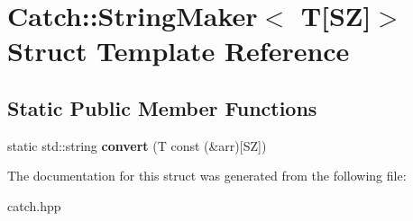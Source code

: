 \hypertarget{structCatch_1_1StringMaker_3_01T[SZ]_4}{}\section{Catch\+:\+:String\+Maker$<$ T\mbox{[}SZ\mbox{]}$>$ Struct Template Reference}
\label{structCatch_1_1StringMaker_3_01T[SZ]_4}
\subsection*{Static Public Member Functions}
\begin{DoxyCompactItemize}
\item 
static std\+::string {\bfseries convert} (T const (\&arr)\mbox{[}SZ\mbox{]})\hypertarget{structCatch_1_1StringMaker_3_01T[SZ]_4_ab10ef3c2111d6faa2ed2f23a1e00c29a}{}\label{structCatch_1_1StringMaker_3_01T[SZ]_4_ab10ef3c2111d6faa2ed2f23a1e00c29a}

\end{DoxyCompactItemize}


The documentation for this struct was generated from the following file\+:\begin{DoxyCompactItemize}
\item 
catch.\+hpp\end{DoxyCompactItemize}
